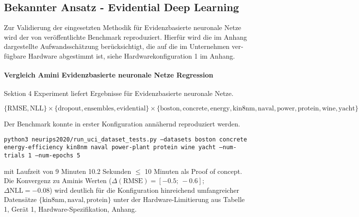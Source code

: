 \begin{otherlanguage}{ngerman}
\section*{Bekannter Ansatz - Evidential Deep Learning}

Zur Validierung der eingesetzten Methodik für \gls{Evidenzbasierte neuronale Netze} wird der von \parencite{amini2020deep} veröffentlichte Benchmark reproduziert. Hierfür wird die im Anhang dargestellte Aufwandsschätzung berücksichtigt, die auf die im Unternehmen verfügbare Hardware abgestimmt ist, siehe Hardwarekonfiguration 1 im Anhang.

\paragraph{Vergleich Amini \gls{Evidenzbasierte neuronale Netze} Regression} \parencite{amini2020deep} Sektion 4 Experiment liefert Ergebnisse für \gls{Evidenzbasierte neuronale Netze}.  
\begin{noindentquote}
\scriptsize
$
\{ \text{RMSE}, \text{NLL} \} 
\times 
\{ \text{dropout}, \text{ensembles}, \text{evidential} \} 
\times 
\{ \text{boston}, \text{concrete}, \text{energy}, \text{kin8nm}, \text{naval}, \text{power}, \text{protein}, \text{wine}, \text{yacht} \}
$  
\end{noindentquote}
Der Benchmark konnte in erster Konfiguration annähernd reproduziert werden. 
\begin{noindentquote}
  \scriptsize
  \texttt{python3 neurips2020/run\_uci\_dataset\_tests.py --datasets boston concrete energy-efficiency kin8nm naval power-plant protein wine yacht --num-trials 1 --num-epochs 5}
\end{noindentquote}
 mit Laufzeit von 9 Minuten 10.2 Sekunden $\leq$ 10 Minuten als \glqq Proof of concept\grqq. Die Konvergenz zu Aminis Werten ($\Delta (\text{RMSE}) = \left[ -0.5;\ -0.6 \right]$; $\Delta \text{NLL} = -0.08$) wird deutlich für die Konfiguration hinreichend umfangreicher Datensätze $\{\text{kin8nm}, \text{naval}, \text{protein} \}$ unter der Hardware-Limitierung aus Tabelle 1, Gerät 1, Hardware-Spezifikation, Anhang. %


\end{otherlanguage}
